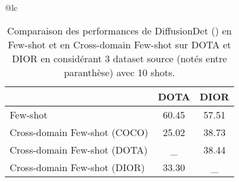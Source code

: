 \begin{table}[h]

    \label{tab:comparisonfscd}
    \begin{adjustbox}{width=0.75\textwidth}
        \begin{tabular}{@{}lc}
            \begin{tabular}{@{}lcc}
                \toprule[1pt]
                & \textbf{DOTA} & \textbf{DIOR} \\ \hline
                Few-shot              & 60.45         & 57.51         \\ \hline
                Cross-domain Few-shot (COCO) & 25.02         & 38.73         \\
                Cross-domain Few-shot (DOTA) & \_         & 38.44         \\
                Cross-domain Few-shot (DIOR) & 33.30         & \_         \\\bottomrule[1pt]
            \end{tabular}%
        \end{tabular}%
    \end{adjustbox}
    \caption{Comparaison des performances de DiffusionDet (\cite{chen2022diffusiondet}) en Few-shot et en Cross-domain Few-shot sur DOTA et DIOR en considérant 3 dataset source (notés entre paranthèse) avec 10 shots.}

\end{table}